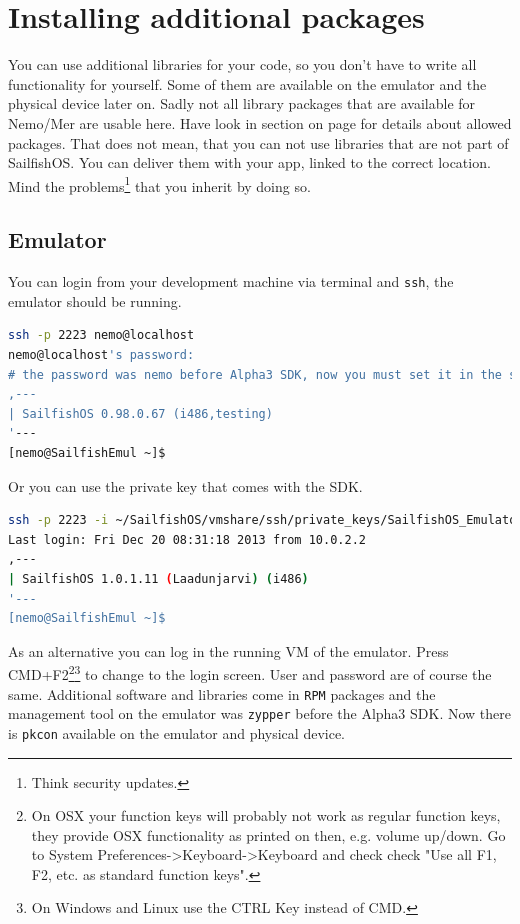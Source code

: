 %
\section{Installing additional packages}\label{sec:addpkg}
%
You can use additional libraries for your code, so you don't have to write all functionality for yourself. Some of them are available on the emulator and the physical device later on. Sadly not all library packages that are available for Nemo/Mer are usable here. Have look in section  on page \pageref{sec:harbour} for details about allowed packages. That does not mean, that you can not use libraries that are not part of SailfishOS. You can deliver them with your app, linked to the correct location. Mind the problems\footnote{Think security updates.} that you inherit by doing so.
%
%
\subsection{Emulator}\label{subsec:pkgemulator}
%
You can login from your development machine via terminal and \verb,ssh,, the emulator should be running.
\begin{lstlisting}[language=bash]
ssh -p 2223 nemo@localhost
nemo@localhost's password:
# the password was nemo before Alpha3 SDK, now you must set it in the settings app inside the emulator!
,---
| SailfishOS 0.98.0.67 (i486,testing)
'---
[nemo@SailfishEmul ~]$
\end{lstlisting}
%
Or you can use the private key that comes with the SDK.
%
\begin{lstlisting}[language=bash]
ssh -p 2223 -i ~/SailfishOS/vmshare/ssh/private_keys/SailfishOS_Emulator/nemo nemo@localhost
Last login: Fri Dec 20 08:31:18 2013 from 10.0.2.2
,---
| SailfishOS 1.0.1.11 (Laadunjarvi) (i486)
'---
[nemo@SailfishEmul ~]$
\end{lstlisting}
%
As an alternative you can log in the running VM of the emulator. Press CMD+F2\footnote{On OSX your function keys will probably not work as regular function keys, they provide OSX functionality as printed on then, e.g. volume up/down. Go to System Preferences->Keyboard->Keyboard and check check "Use all F1, F2, etc. as standard function keys".}\footnote{On Windows and Linux use the CTRL Key instead of CMD.} to change to the login screen. User and password are of course the same.
%
Additional software and libraries come in \verb,RPM, packages and the management tool on the emulator was \verb,zypper, before the Alpha3 SDK. Now there is \verb,pkcon,\cite{pkcon01} available on the emulator and physical device.
%
%
